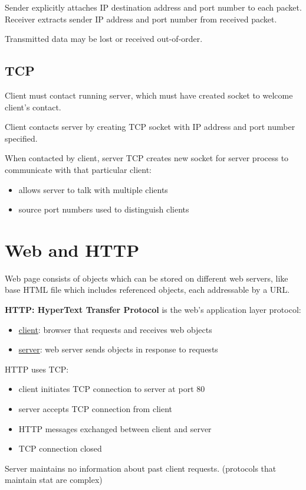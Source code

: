 \documentclass[11pt]{article}
\begin{document}
Sender explicitly attaches IP destination address and port number to each packet.
Receiver extracts sender IP address and port number from received packet.

Transmitted data may be lost or received out-of-order.
\subsection{TCP}
\label{sec:org6489d05}
Client must contact running server, which must have created socket to welcome client's contact.

Client contacts server by creating TCP socket with IP address and port number specified.

When contacted by client, server TCP creates new socket for server process to communicate with
that particular client:
\begin{itemize}
\item allows server to talk with multiple clients
\item source port numbers used to distinguish clients
\end{itemize}
\section{Web and HTTP}
\label{sec:orgb5b72df}
Web page consists of objects which can be stored on different web servers,
like base HTML file which includes referenced objects, each addressable by a URL.

\textbf{HTTP: HyperText Transfer Protocol} is the web's application layer protocol:
\begin{itemize}
\item \uline{client}: browser that requests and receives web objects
\item \uline{server}: web server sends objects in response to requests
\end{itemize}

HTTP uses TCP:
\begin{itemize}
\item client initiates TCP connection to server at port 80
\item server accepts TCP connection from client
\item HTTP messages exchanged between client and server
\item TCP connection closed
\end{itemize}

Server maintains no information about past client requests.
(protocols that maintain stat are complex)
\end{document}
